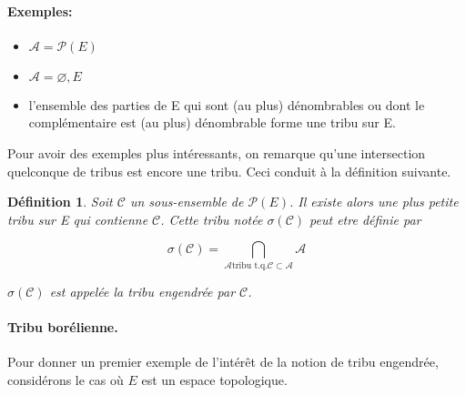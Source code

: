 \documentclass[a4paper,twoside,11pt]{book}
\newtheorem{definition}{Définition}[section]
\begin{document}
\paragraph*{Exemples:}
\begin{itemize}
\item $ \mathcal{A} = \mathcal{P}(E)$
\item $ \mathcal{A} = {  \varnothing , E} $
\item l'ensemble des parties de E qui sont (au plus) dénombrables ou dont le complémentaire
est (au plus) dénombrable forme une tribu sur E.
\end{itemize}


Pour avoir des exemples plus intéressants, on remarque qu'une intersection quelconque de tribus est encore une tribu. Ceci conduit à la définition suivante.

\begin{definition} Soit  $\mathcal{C}$ un sous-ensemble de $\mathcal{P}(E)$. Il existe alors une plus petite tribu sur E qui contienne $\mathcal{C}$. Cette tribu notée $\sigma(\mathcal{C})$ peut etre définie par

$$
	\sigma(\mathcal{C}) = \bigcap_{\mathcal{A} \text{tribu t.q.}  \mathcal{C} \subset \mathcal{A} } \mathcal{A}
$$

$\sigma(\mathcal{C})$ est appelée la tribu engendrée par $ \mathcal{C}$.
\end{definition}

\paragraph*{Tribu borélienne.} Pour donner un premier exemple de l'intérêt de la notion de tribu engendrée, considérons le cas où $E$
est un espace topologique.
\end{document}
